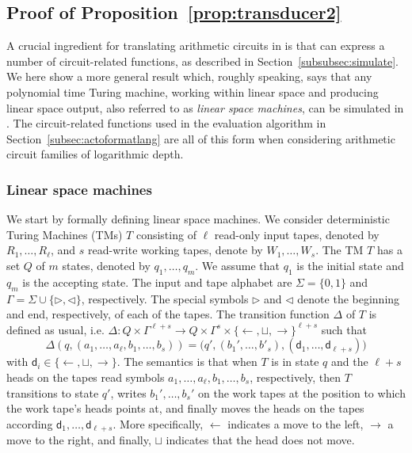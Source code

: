 \subsection{Proof of Proposition~\ref{prop:transducer2}}
A crucial ingredient for translating arithmetic circuits in \langfor is that \langfor
can express a number of circuit-related functions, as described in Section~\ref{subsubsec:simulate}.
We here show a more general result which, roughly speaking, says that any 
polynomial time Turing machine, working within linear space and producing linear space output, also
referred to as \textit{linear space machines}, 
can be simulated in \langfor. The circuit-related functions used in the evaluation algorithm in Section~\ref{subsec:actoformatlang}
are all of this form when considering arithmetic circuit families of logarithmic depth.

\subsubsection{Linear space machines}\label{subsubsec:linearspace}
We start by formally defining linear space machines. We consider  deterministic Turing Machines (TMs) $T$ 
consisting of $\ell$ read-only input tapes, denoted by $R_1,\ldots,R_\ell$, and
$s$ read-write working tapes, denote by $W_1,\ldots,W_s$. The TM $T$ has a set 
$Q$ of $m$ states, denoted by $q_1,\ldots,q_m$. We assume that $q_1$ is the initial state and $q_m$ is the accepting state.
The input and tape alphabet are $\Sigma=\{0,1\}$ and $\Gamma=\Sigma\cup\{\rhd,\lhd\}$, respectively. The special 
symbols $\rhd$ and $\lhd$ denote the beginning and end, respectively, of each of the tapes.
The transition function $\Delta$ of $T$ is defined as usual, i.e. 
$\Delta:Q\times \Gamma^{\ell+s} \to Q\times \Gamma^{s}\times \{\leftarrow,\sqcup,\rightarrow\}^{\ell+s}$ 
such that
$$
\Delta(q,(a_1,\ldots,a_{\ell},b_1, \ldots, b_s))=\bigl(q',(b_1',\ldots, b'_s),(\mathsf{d}_1,\ldots,\mathsf{d}_{\ell+s})\bigr)
$$
with $\mathsf{d}_i\in \{\leftarrow,\sqcup,\rightarrow\}$. The semantics is that when $T$ is in state $q$ and the $\ell+s$ 
heads on the tapes read symbols $a_1,\ldots,a_{\ell},b_1, \ldots, b_s$, respectively, then $T$ transitions to state $q'$,
writes $b_1', \ldots, b_s'$ on the work tapes at the position to which the work
tape's heads points at, and finally moves the heads on the tapes according 
$\mathsf{d}_1,\ldots,\mathsf{d}_{\ell+s}$. More specifically, $\leftarrow$  indicates a move to the left, 
$\rightarrow$ a move to the right, and finally, $\sqcup$ indicates that the head does not move.

